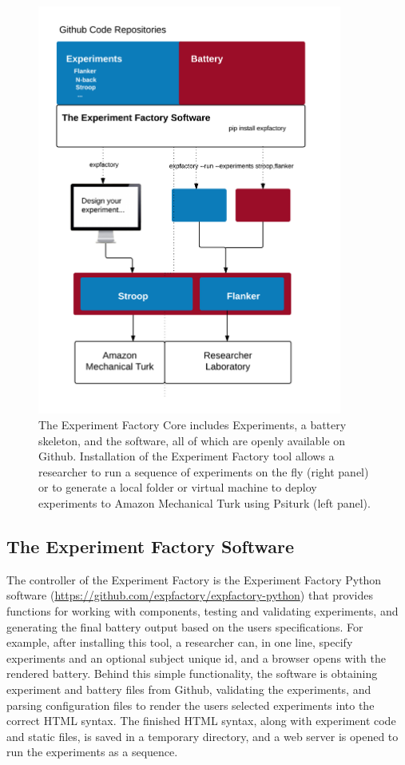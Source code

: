 \documentclass{report}
\begin{document}
\begin{figure}[h!]
\begin{center}
\includegraphics[width=10cm]{images/figure41.png}%
\end{center}
\caption{\label{fig:41} The Experiment Factory Core includes Experiments, a battery skeleton, and the software, all of which are openly available on Github. Installation of the Experiment Factory tool allows a researcher to run a sequence of experiments on the fly (right panel) or to generate a local folder or virtual machine to deploy experiments to Amazon Mechanical Turk using Psiturk (left panel).}
\end{figure}

\subsection{The Experiment Factory Software}

The controller of the Experiment Factory is the Experiment Factory
Python software \newline (\href{https://github.com/expfactory/expfactory-python}{https://github.com/expfactory/expfactory-python}) that
provides functions for working with components, testing and validating
experiments, and generating the final battery output based on the users
specifications. For example, after installing this tool, a researcher
can, in one line, specify experiments and an optional subject unique id,
and a browser opens with the rendered battery. Behind this simple
functionality, the software is obtaining experiment and battery files
from Github, validating the experiments, and parsing configuration files
to render the users selected experiments into the correct HTML syntax.
The finished HTML syntax, along with experiment code and static files,
is saved in a temporary directory, and a web server is opened to run the
experiments as a sequence.
\end{document}
